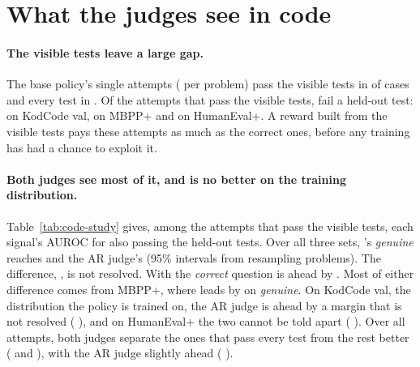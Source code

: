 
\section{What the judges see in code}\label{sec:res-study}

\paragraph{The visible tests leave a large gap.} The base policy's  single attempts (
per problem) pass the visible tests in  of cases and every test in . Of the
attempts that pass the visible tests,  fail a held-out test:  on KodCode val,
 on MBPP+ and  on HumanEval+. A reward built from the visible tests pays these
attempts as much as the correct ones, before any training has had a chance to exploit it.

\paragraph{Both judges see most of it, and \kev{} is no better on the training distribution.}
Table~\ref{tab:code-study} gives, among the attempts that pass the visible tests, each signal's AUROC for also passing
the held-out tests. Over all three sets, \kev{}'s \emph{genuine} reaches 
 and the AR judge's 
 (95\% intervals from resampling problems). The difference,
 , is not resolved. With the \emph{correct}
question \kev{} is ahead by  . Most of
either difference comes from MBPP+, where \kev{} leads by 
 on \emph{genuine}. On KodCode val, the distribution the policy
is trained on, the AR judge is ahead by a margin that is not resolved (
), and on HumanEval+ the two cannot be told apart
( ). Over all attempts, both judges separate the ones that pass
every test from the rest better ( and ), with the AR judge slightly ahead
( ).

